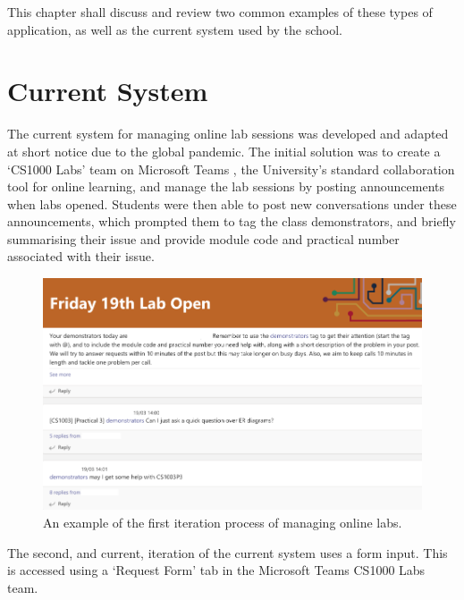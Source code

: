 This chapter shall discuss and review two common examples of these types of application, as well as the current system used by the school.

\section{Current System}

The current system for managing online lab sessions was developed and adapted at short notice due to the global pandemic. The initial solution was to create a `CS1000 Labs' team on Microsoft Teams \cite{teams}, the University's standard collaboration tool for online learning, and manage the lab sessions by posting announcements when labs opened. Students were then able to post new conversations under these announcements, which prompted them to tag the class demonstrators, and briefly summarising their issue and provide module code and practical number associated with their issue.

\FloatBarrier
\begin{figure}[H]
  \centering
  \includegraphics[width=\textwidth]{2context/images/teams1.png}
  \caption{An example of the first iteration process of managing online labs.}
\end{figure}

The second, and current, iteration of the current system uses a form input. This is accessed using a `Request Form' tab in the Microsoft Teams \cite{teams} CS1000 Labs team. 

